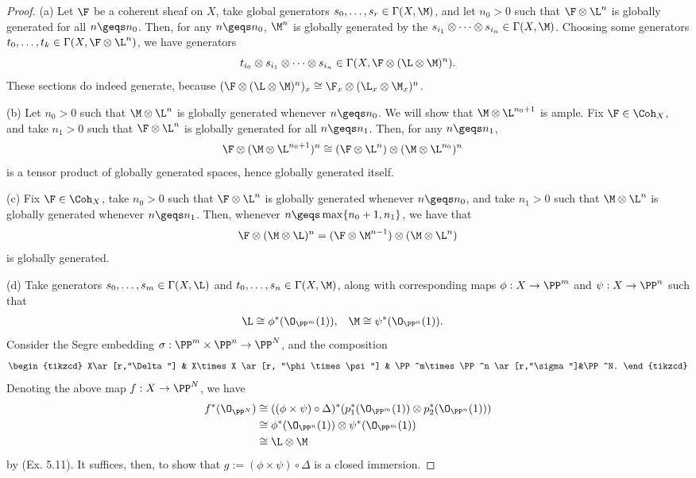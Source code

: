 \documentclass[12pt]{amsart}
\begin{document}
\begin{proof}
  (a) Let $\F$ be a coherent sheaf on $X$, take global generators $s_0,\ldots, s_r\in \Gamma(X,\M)$, and let $n_0>0$ such that $\F\otimes \L^n$ is globally generated for all $n\geqs n_0$.
  Then, for any $n\geqs n_0$, $\M^n$ is globally generated by the $s_{i_1}\otimes\cdots \otimes s_{i_n}\in \Gamma(X,\M)$.
  Choosing some generators $t_0,\ldots, t_k\in \Gamma(X,\F\otimes \L^n)$, we have generators 
  \[
    t_{i_0}\otimes s_{i_1}\otimes\cdots\otimes s_{i_n}\in \Gamma(X,\F\otimes (\L\otimes\M)^n).
  \]
  These sections do indeed generate, because $(\F\otimes (\L\otimes \M)^n)_x\cong \F_x\otimes (\L_x\otimes \M_x)^n$.

  (b) Let $n_0>0$ such that $\M\otimes \L^n$  is globally generated whenever $n\geqs n_0$.
  We will show that $\M\otimes \L^{n_0+1}$ is ample.
  Fix $\F\in\Coh_X$, and take $n_1>0$ such that $\F\otimes \L^n$ is globally generated for all $n\geqs n_1$.
  Then, for any $n\geqs n_1$,
  \begin{align*}
    \F\otimes (\M\otimes \L^{n_0+1})^n 
    &\cong (\F\otimes \L^n)\otimes (\M\otimes \L^{n_0})^n
  \end{align*}
  is a tensor product of globally generated spaces, hence globally generated itself.

  (c) Fix $\F\in \Coh_X$, take $n_0>0$ such that $\F\otimes \L^n$ is globally generated whenever $n\geqs n_0$, and take $n_1>0$ such that $\M\otimes \L^n$ is globally generated whenever $n\geqs n_1$.
  Then, whenever $n\geqs \max\{n_0+1,n_1\}$, we have that
  \[
    \F\otimes (\M\otimes \L)^n 
    = (\F\otimes \M^{n-1})\otimes (\M\otimes\L^n)
  \] 
  is globally generated.

  (d) Take generators $s_0,\ldots, s_m\in \Gamma(X,\L)$ and $t_0,\ldots, s_n\in \Gamma(X,\M)$, along with corresponding maps $\phi:X\to \PP^m$ and $\psi:X\to \PP^n$ such that 
  \begin{align*}
    \L &\cong \phi^*(\O_{\PP^m}(1)),
    \;\;\;\M \cong \psi^*(\O_{\PP^n}(1)).
  \end{align*}
  Consider the Segre embedding $\sigma:\PP^m\times \PP^n\to \PP^N$, and the composition %
  \[
    \begin{tikzcd}
      X\ar[r,"\Delta"] & X\times X \ar[r, "\phi\times \psi"] & \PP^m\times \PP^n \ar[r,"\sigma"]&\PP^N.
    \end{tikzcd}
  \] 
  Denoting the above map $f:X\to \PP^N$, we have
  \begin{align*}
    f^*(\O_{\PP^N}) 
    &\cong ((\phi\times\psi)\circ\Delta)^*(p_1^*(\O_{\PP^m}(1))\otimes p_2^*(\O_{\PP^n}(1))) \\
    &\cong \phi^*(\O_{\PP^n}(1))\otimes \psi^*(\O_{\PP^m}(1)) \\
    &\cong \L\otimes \M
  \end{align*}
  by (Ex. 5.11).
  It suffices, then, to show that $g:=(\phi\times \psi)\circ \Delta$ is a closed immersion.


\end{proof}
\end{document}
